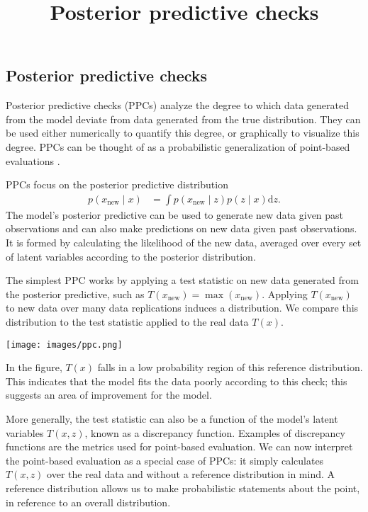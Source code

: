 \title{Posterior predictive checks}

\subsection{Posterior predictive checks}

Posterior predictive checks (PPCs)
analyze the degree to which data generated from the model deviate from
data generated from the true distribution. They can be used either
numerically to quantify this degree, or graphically to visualize this
degree. PPCs can be thought of as a probabilistic generalization of
point-based evaluations
\citep{box1980sampling,rubin1984bayesianly,meng1994posterior,gelman1996posterior}.

PPCs focus on the posterior predictive distribution
\begin{align*}
  p(x_\text{new} \mid x)
  &=
  \int
  p(x_\text{new} \mid z)
  p(z \mid x)
  \text{d} z.
\end{align*}
The model's posterior predictive can be used to generate new data
given past observations and can also make predictions on new data
given past observations.
It is formed by calculating the likelihood of the new data, averaged
over every set of latent variables according to the posterior
distribution.

The simplest PPC works by applying a test statistic on new data
generated from the posterior predictive, such as
$T(x_\text{new}) = \max(x_\text{new})$.  Applying $T(x_\text{new})$ to
new data over many data replications induces a distribution. We compare
this distribution to the test statistic applied to the real data $T(x)$.

\texttt{[image: images/ppc.png]}

In the figure, $T(x)$ falls in a low probability region of this
reference distribution. This indicates that the model fits the data
poorly according to this check; this suggests an area of improvement
for the model.

More generally, the test statistic can also be a function of the
model's latent variables $T(x, z)$, known as a discrepancy function.
Examples of discrepancy functions are the metrics used for point-based
evaluation. We can now interpret the point-based evaluation as a
special case of PPCs: it simply calculates $T(x, z)$ over the real
data and without a reference distribution in mind. A reference
distribution allows us to make probabilistic statements about the
point, in reference to an overall distribution.


